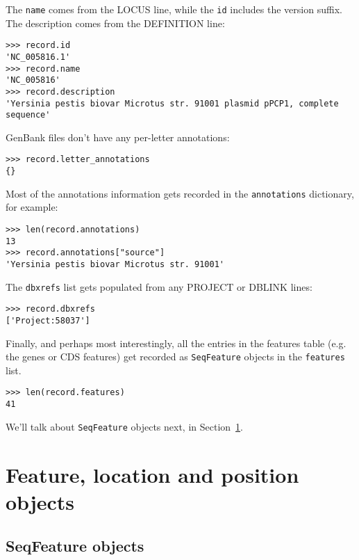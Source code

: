 The \verb|name| comes from the LOCUS line, while the \verb|id| includes the version suffix.
The description comes from the DEFINITION line:

\begin{verbatim}
>>> record.id
'NC_005816.1'
>>> record.name
'NC_005816'
>>> record.description
'Yersinia pestis biovar Microtus str. 91001 plasmid pPCP1, complete sequence'
\end{verbatim}

GenBank files don't have any per-letter annotations:

\begin{verbatim}
>>> record.letter_annotations
{}
\end{verbatim}

Most of the annotations information gets recorded in the \verb|annotations| dictionary, for example:

\begin{verbatim}
>>> len(record.annotations)
13
>>> record.annotations["source"]
'Yersinia pestis biovar Microtus str. 91001'
\end{verbatim}

The \verb|dbxrefs| list gets populated from any PROJECT or DBLINK lines:

\begin{verbatim}
>>> record.dbxrefs
['Project:58037']
\end{verbatim}

Finally, and perhaps most interestingly, all the entries in the features table (e.g. the genes or CDS features) get recorded as \verb|SeqFeature| objects in the \verb|features| list.

\begin{verbatim}
>>> len(record.features)
41
\end{verbatim}

\noindent We'll talk about \verb|SeqFeature| objects next, in
Section~\ref{sec:seq_features}.

\section{Feature, location and position objects}
\label{sec:seq_features}

\subsection{SeqFeature objects}

